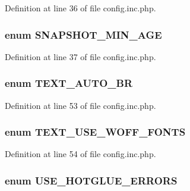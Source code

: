 Definition at line 36 of file config.inc.php.

\hypertarget{config_8inc_8php_a7fb94ff6aaa61e964fe2f90f738d5cb3}{
\subsubsection[{SNAPSHOT\_\-MIN\_\-AGE}]{\setlength{\rightskip}{0pt plus 5cm}enum {\bf SNAPSHOT\_\-MIN\_\-AGE}}}
\label{config_8inc_8php_a7fb94ff6aaa61e964fe2f90f738d5cb3}


Definition at line 37 of file config.inc.php.

\hypertarget{config_8inc_8php_a6f581226f389510394c592491ebedc0b}{
\subsubsection[{TEXT\_\-AUTO\_\-BR}]{\setlength{\rightskip}{0pt plus 5cm}enum {\bf TEXT\_\-AUTO\_\-BR}}}
\label{config_8inc_8php_a6f581226f389510394c592491ebedc0b}


Definition at line 53 of file config.inc.php.

\hypertarget{config_8inc_8php_aca83853e44d4952801b133bf687a1056}{
\subsubsection[{TEXT\_\-USE\_\-WOFF\_\-FONTS}]{\setlength{\rightskip}{0pt plus 5cm}enum {\bf TEXT\_\-USE\_\-WOFF\_\-FONTS}}}
\label{config_8inc_8php_aca83853e44d4952801b133bf687a1056}


Definition at line 54 of file config.inc.php.

\hypertarget{config_8inc_8php_a4be2ca4abd0486feb76708f3cf7e671d}{
\subsubsection[{USE\_\-HOTGLUE\_\-ERRORS}]{\setlength{\rightskip}{0pt plus 5cm}enum {\bf USE\_\-HOTGLUE\_\-ERRORS}}}
\label{config_8inc_8php_a4be2ca4abd0486feb76708f3cf7e671d}


